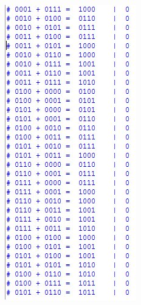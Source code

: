\begin{figure}[H]
\begin{subfigure}[b]{0.44\textwidth}
			\includegraphics[width=\textwidth]{img/etapa3/simulacaoSomadorCompleto4Bits_2}
			\label{fig:etapa3-2}
		\end{subfigure}


\end{figure}
